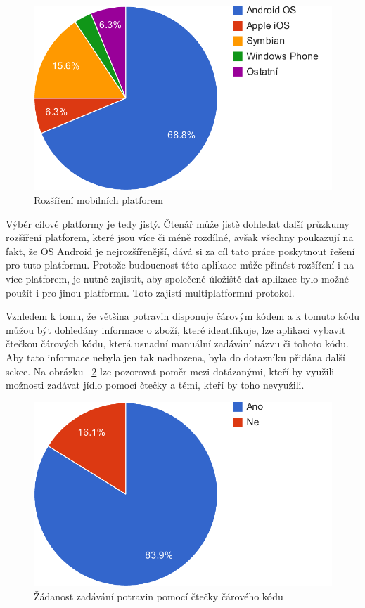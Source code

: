 \documentclass[thesis=B,czech]{FITthesis}[2013/10/20]
\begin{document}
\begin{figure}[H]
  \centering
  \includegraphics[scale=0.8]{charts/survey_os}
  \caption{Rozšíření mobilních platforem}
  \label{fig:SurveyOS}
\end{figure}

Výběr cílové platformy je tedy jistý. Čtenář může jistě dohledat další průzkumy rozšíření platforem, které jsou více či méně rozdílné, avšak všechny poukazují na fakt, že OS Android je nejrozšířenější, dává si za cíl tato práce poskytnout řešení pro tuto platformu. Protože budoucnost této aplikace může přinést rozšíření i na více platforem, je nutné zajistit, aby společené úložiště dat aplikace bylo možné použít i pro jinou platformu. Toto zajistí multiplatformní protokol.

Vzhledem k tomu, že většina potravin disponuje čárovým kódem a k tomuto kódu můžou být dohledány informace o zboží, které identifikuje, lze aplikaci vybavit čtečkou čárových kódu, která usnadní manuální zadávání názvu či tohoto kódu. Aby tato informace nebyla jen tak nadhozena, byla do dotazníku přidána další sekce. Na obrázku ~\ref{fig:SurveyScan} lze pozorovat poměr mezi dotázanými, kteří by využili možnosti zadávat jídlo pomocí čtečky a těmi, kteří by toho nevyužili.

\begin{figure}[H]
  \centering
  \includegraphics[scale=0.8]{charts/survey_scan}
  \caption{Žádanost zadávání potravin pomocí čtečky čárového kódu}
  \label{fig:SurveyScan}
\end{figure}
\end{document}
